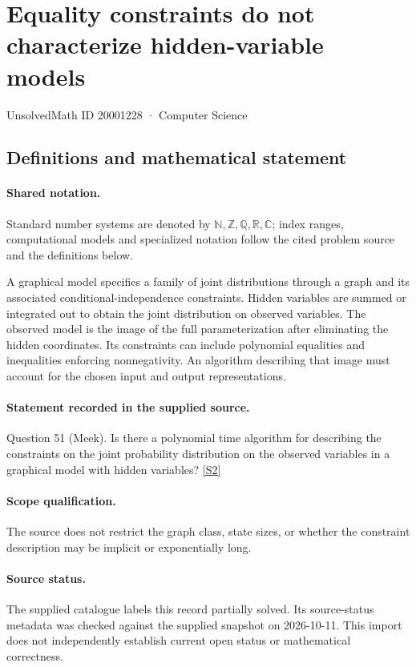 \documentclass[11pt]{article}
\newcommand{\sref}[2]{\hyperlink{source:#1:#2}{[S#2]}}
\begin{document}
\setcounter{section}{20001227}
\section{Equality constraints do not characterize hidden-variable models}\label{20001228}
{\small\sffamily UnsolvedMath ID 20001228 · Computer Science}
\subsection{Definitions and mathematical statement}

\paragraph{Shared notation.}Standard number systems are denoted by $\mathbb N,\mathbb Z,\mathbb Q,\mathbb R,\mathbb C$; index ranges, computational models and specialized notation follow the cited problem source and the definitions below.


A graphical model specifies a family of joint distributions through a graph and its associated conditional-independence constraints. Hidden variables are summed or integrated out to obtain the joint distribution on observed variables. The observed model is the image of the full parameterization after eliminating the hidden coordinates. Its constraints can include polynomial equalities and inequalities enforcing nonnegativity. An algorithm describing that image must account for the chosen input and output representations.
\paragraph{Statement recorded in the supplied source.}
Question 51 (Meek). Is there a polynomial time algorithm for describing the constraints on the joint probability distribution on the observed variables in a graphical model with hidden variables? \sref{20001228}{2}
\paragraph{Scope qualification.}
The source does not restrict the graph class, state sizes, or whether the constraint description may be implicit or exponentially long.
\paragraph{Source status.}
The supplied catalogue labels this record partially solved. Its source-status metadata was checked against the supplied snapshot on 2026-10-11. This import does not independently establish current open status or mathematical correctness.
\end{document}
